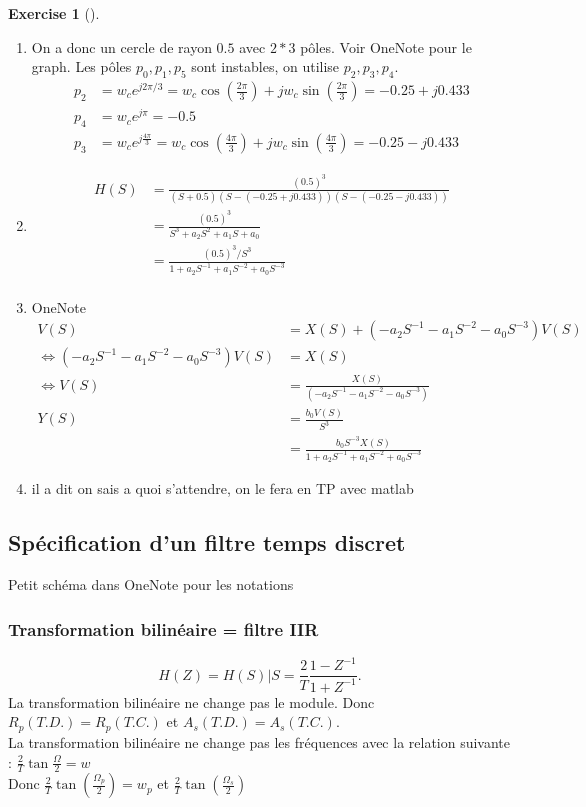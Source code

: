 \documentclass{article}
\theoremstyle{plain}%
\theoremstyle{definition}
\newtheorem{xca}[exmp]{Exercise}
\theoremstyle{remark}
\begin{document}
\begin{xca}[]
\begin{enumerate}
        \item On a donc un cercle de rayon $ 0.5 $ avec $ 2*3 $ pôles. Voir OneNote pour le graph. Les pôles $ p_0, p_1, p_5 $ sont instables, on utilise $ p_2, p_3, p_4 $.\begin{align*}
            p_2 &= w_c e^{j 2 \pi /3} = w_c \cos (\frac{2 \pi}{3}) + j w_c \sin (\frac{2 \pi }{3}) = -0.25 + j 0.433 \\
            p_4 &= w_c e^{j \pi } = -0.5 \\
            p_3 &= w_c e^{j \frac{4 \pi }{3}} = w_c \cos (\frac{4 \pi}{3}) + j w_c \sin (\frac{4 \pi}{3}) = -0.25 - j 0.433
        \end{align*} 
        \item 
        \begin{align*}
            H(S) &= \frac{(0.5)^3}{(S+0.5) (S - (-0.25+j 0.433)) (S - (-0.25 - j 0.433))} \\
                &= \frac{(0.5)^3}{S^3 + a_2 S^2 + a_1 S + a_0} \\
                &= \frac{(0.5)^3 / S^3}{1 + a_2 S^{-1} + a_1 S^{-2} + a_0 S^{-3}} \\
        \end{align*} 
        \item OneNote \begin{align*}
            V(S) &= X(S) + (-a_2 S^{-1} - a_1 S^{-2} - a_0 S^{-3} )V(S) \\
            \Leftrightarrow (-a_2 S^{-1} - a_1 S^{-2} - a_0 S^{-3} ) V(S) &= X(S) \\ 
            \Leftrightarrow V(S) &= \frac{X(S)}{(-a_2 S^{-1} - a_1 S^{-2} - a_0 S^{-3} )} \\
            Y(S) &= \frac{b_0 V(S)}{S^3} \\ 
                &= \frac{ b_0S^{-3} X(S) }{1 + a_2 S^{-1} + a_1 S^{-2} + a_0 S^{-3}}
        \end{align*}
        \item il a dit on sais a quoi s'attendre, on le fera en TP avec matlab
    \end{enumerate}
\end{xca}

\subsection{Spécification d'un filtre temps discret}
Petit schéma dans OneNote pour les notations

\subsubsection{Transformation bilinéaire = filtre IIR}
\[
    H(Z) = H(S) | S = \frac{2}{T} \frac{1 - Z^{-1}}{1 + Z^{-1}}
.\]
La transformation bilinéaire ne change pas le module. Donc $ R_p (T.D.) = R_p(T.C.) $ et $ A_s(T.D.) = A_s(T.C.) $. \\
La transformation bilinéaire ne change pas les fréquences avec la relation suivante : $ \frac{2}{T} \tan \frac{\Omega }{2} = w $ \\
Donc $ \frac{2}{T}\tan (\frac{\Omega_p}{2}) = w_p $ et $ \frac{2}{T} \tan (\frac{\Omega _s}{2}) $ 
\end{document}
